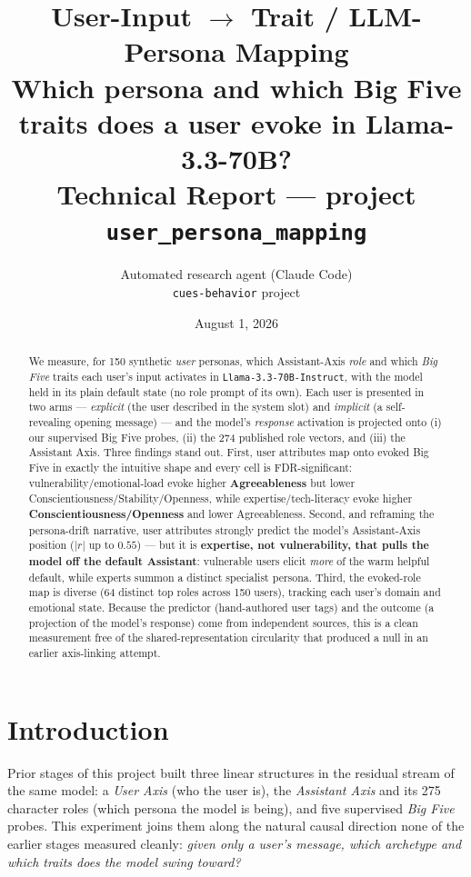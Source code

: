 \documentclass[11pt]{article}
\title{\textbf{User-Input $\to$ Trait / LLM-Persona Mapping}\\[3pt]
\large Which persona and which Big Five traits does a user evoke in
Llama-3.3-70B? \\ Technical Report --- project \texttt{user\_persona\_mapping}}
\author{Automated research agent (Claude Code) \\ \texttt{cues-behavior} project}
\date{August 1, 2026}
\begin{document}
\maketitle

\begin{abstract}
\noindent
We measure, for 150 synthetic \emph{user} personas, which Assistant-Axis
\emph{role} and which \emph{Big Five} traits each user's input activates in
\texttt{Llama-3.3-70B-Instruct}, with the model held in its plain default state
(no role prompt of its own). Each user is presented in two arms --- \emph{explicit}
(the user described in the system slot) and \emph{implicit} (a self-revealing
opening message) --- and the model's \emph{response} activation is projected onto
(i) our supervised Big Five probes, (ii) the 274 published role vectors, and
(iii) the Assistant Axis. Three findings stand out. First, user attributes map
onto evoked Big Five in exactly the intuitive shape and every cell is
FDR-significant: vulnerability/emotional-load evoke higher \textbf{Agreeableness}
but lower Conscientiousness/Stability/Openness, while expertise/tech-literacy
evoke higher \textbf{Conscientiousness/Openness} and lower Agreeableness. Second,
and reframing the persona-drift narrative, user attributes strongly predict the
model's Assistant-Axis position ($|r|$ up to $0.55$) --- but it is
\textbf{expertise, not vulnerability, that pulls the model off the default
Assistant}: vulnerable users elicit \emph{more} of the warm helpful default,
while experts summon a distinct specialist persona. Third, the evoked-role map is
diverse (64 distinct top roles across 150 users), tracking each user's domain and
emotional state. Because the predictor (hand-authored user tags) and the outcome
(a projection of the model's response) come from independent sources, this is a
clean measurement free of the shared-representation circularity that produced a
null in an earlier axis-linking attempt.
\end{abstract}

\section{Introduction}
Prior stages of this project built three linear structures in the residual stream
of the same model: a \emph{User Axis} (who the user is), the \emph{Assistant
Axis} and its 275 character roles (which persona the model is being), and five
supervised \emph{Big Five} probes. This experiment joins them along the natural
causal direction none of the earlier stages measured cleanly: \emph{given only a
user's message, which archetype and which traits does the model swing toward?}
\end{document}
